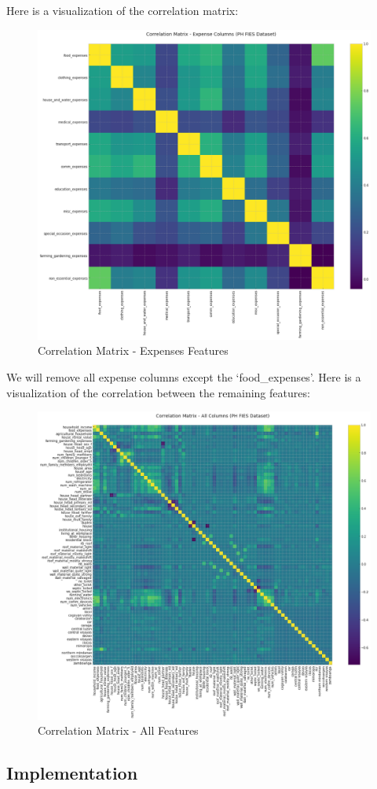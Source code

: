 \documentclass{article}
\begin{document}
Here is a visualization of the correlation matrix:

\begin{figure}[H]
\caption{Correlation Matrix - Expenses Features}
\centering
\includegraphics[width = 0.7 \textwidth]{expenses_corr_matrix}
\end{figure}

We will remove all expense columns except the ‘food\_expenses’. Here is a visualization of the correlation between the remaining features:

\begin{figure}[H]
\caption{Correlation Matrix - All Features}
\centering
\includegraphics[width = 0.7 \textwidth]{all_features_corr_2}
\end{figure}

\subsection{Implementation}
\end{document}
